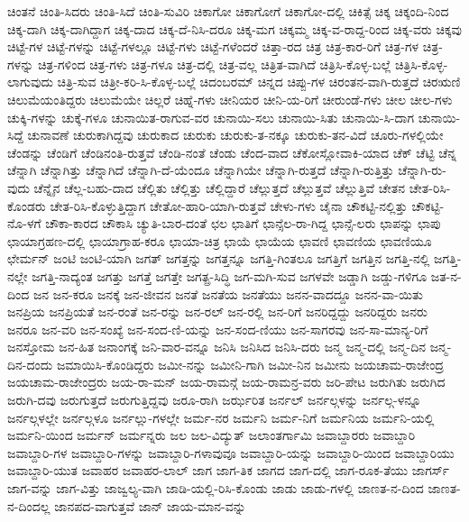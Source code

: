 {ಚಿಂತನೆ
ಚಿಂತಿ-ಸಿದರು
ಚಿಂತಿ-ಸಿದೆ
ಚಿಂತಿ-ಸುವಿರಿ
ಚಿಕಾಗೋ
ಚಿಕಾಗೋಗೆ
ಚಿಕಾಗೋ-ದಲ್ಲಿ
ಚಿಕಿತ್ಸೆ
ಚಿಕ್ಕ
ಚಿಕ್ಕಂದಿ-ನಿಂದ
ಚಿಕ್ಕ-ದಾಗಿ
ಚಿಕ್ಕ-ದಾಗಿದ್ದಾಗ
ಚಿಕ್ಕ-ದಾದ
ಚಿಕ್ಕ-ದೆ-ನಿಸಿ-ದರೂ
ಚಿಕ್ಕ-ಮಗ
ಚಿಕ್ಕಮ್ಮ
ಚಿಕ್ಕ-ವ-ರಾದ್ದ-ರಿಂದ
ಚಿಕ್ಕ-ವರು
ಚಿಕ್ಕವು
ಚಿಟ್ಟೆ-ಗಳ
ಚಿಟ್ಟೆ-ಗಳನ್ನು
ಚಿಟ್ಟೆ-ಗಳಲ್ಲೂ
ಚಿಟ್ಟೆ-ಗಳು
ಚಿಟ್ಟೆ-ಗಳೆಂದರೆ
ಚಿತ್ತಾ-ರದ
ಚಿತ್ರ
ಚಿತ್ರ-ಕಾರ-ರಿಗೆ
ಚಿತ್ರ-ಗಳ
ಚಿತ್ರ-ಗಳನ್ನು
ಚಿತ್ರ-ಗಳಿಂದ
ಚಿತ್ರ-ಗಳು
ಚಿತ್ರ-ಗಳೂ
ಚಿತ್ರ-ದಲ್ಲಿ
ಚಿತ್ರ-ವಲ್ಲ
ಚಿತ್ರಿತ-ವಾಗಿದೆ
ಚಿತ್ರಿಸಿ-ಕೊಳ್ಳ-ಬಲ್ಲೆ
ಚಿತ್ರಿಸಿ-ಕೊಳ್ಳ-ಲಾಗುವುದು
ಚಿತ್ರಿ-ಸುವ
ಚಿತ್ರೀ-ಕರಿ-ಸಿ-ಕೊಳ್ಳ-ಬಲ್ಲೆ
ಚಿದಂಬರಮ್
ಚಿನ್ನದ
ಚಿಪ್ಪು-ಗಳ
ಚಿರಂತನ-ವಾಗಿ-ರುತ್ತದೆ
ಚಿರಋಣಿ
ಚಿಲುಮೆಯಂತಿದ್ದರು
ಚಿಲುಮೆಯೇ
ಚಿಲ್ಲರೆ
ಚಿಹ್ನೆ-ಗಳು
ಚೀನಿಯರ
ಚೀನಿ-ಯ-ರಿಗೆ
ಚೀರುಂಡೆ-ಗಳು
ಚೀಲ
ಚೀಲ-ಗಳು
ಚುಕ್ಕಿ-ಗಳನ್ನು
ಚುಕ್ಕೆ-ಗಳೂ
ಚುನಾಯಿತ-ರಾಗುವ-ವರ
ಚುನಾಯಿ-ಸಲು
ಚುನಾಯಿ-ಸಿತು
ಚುನಾಯಿ-ಸಿ-ದಾಗ
ಚುನಾಯಿ-ಸಿದ್ದೆ
ಚುನಾವಣೆ
ಚುರುಕಾಗಿದ್ದವು
ಚುರುಕಾದ
ಚುರುಕು
ಚುರುಕು-ತ-ನಕ್ಕೂ
ಚುರುಕು-ತನ-ವಿದೆ
ಚೂರು-ಗಳಲ್ಲಿಯೇ
ಚೆಂಡನ್ನು
ಚೆಂಡಿಗೆ
ಚೆಂಡಿನಂತಿ-ರುತ್ತವೆ
ಚೆಂಡಿ-ನಂತೆ
ಚೆಂಡು
ಚೆಂದ-ವಾದ
ಚೆಕೋಸ್ಲೋವಾಕಿ-ಯಾದ
ಚೆಕ್
ಚೆಟ್ಟಿ
ಚೆನ್ನ
ಚೆನ್ನಾಗಿ
ಚೆನ್ನಾಗಿತ್ತು
ಚೆನ್ನಾಗಿದೆ
ಚೆನ್ನಾಗಿ-ದೆ-ಯೆಂದೂ
ಚೆನ್ನಾಗಿಯೇ
ಚೆನ್ನಾಗಿ-ರುತ್ತದೆ
ಚೆನ್ನಾಗಿ-ರುತ್ತಿತ್ತು
ಚೆನ್ನಾಗಿ-ರು-ವುದು
ಚೆನ್ನೈನ
ಚೆಲ್ಲ-ಬಹು-ದಾದ
ಚೆಲ್ಲಿತು
ಚೆಲ್ಲಿತ್ತು
ಚೆಲ್ಲಿದ್ದಾರೆ
ಚೆಲ್ಲುತ್ತದೆ
ಚೆಲ್ಲುತ್ತವೆ
ಚೆಲ್ಲುತ್ತಿವೆ
ಚೇತನ
ಚೇತ-ರಿಸಿ-ಕೊಂಡರು
ಚೇತ-ರಿಸಿ-ಕೊಳ್ಳುತ್ತಿದ್ದಾಗ
ಚೇತೋ-ಹಾರಿ-ಯಾಗಿ-ರುತ್ತವೆ
ಚೇಳು-ಗಳು
ಚೈನಾ
ಚೌಕಟ್ಟಿ-ನಲ್ಲಿತ್ತು
ಚೌಕಟ್ಟಿ-ನೊ-ಳಗೆ
ಚೌಕಾ-ಕಾರದ
ಚೌಕಾಸಿ
ಚ್ಯುತಿ-ಬಾರ-ದಂತೆ
ಛಲ
ಛಾತಿಗೆ
ಛಾನ್ಸೆಲ-ರಾ-ಗಿದ್ದ
ಛಾನ್ಸೆ-ಲರು
ಛಾಪನ್ನು
ಛಾಪು
ಛಾಯಾಗ್ರಹಣ-ದಲ್ಲಿ
ಛಾಯಾಗ್ರಾಹ-ಕರೂ
ಛಾಯಾ-ಚಿತ್ರ
ಛಾಯೆ
ಛಾಯೆಯ
ಛಾವಣಿ
ಛಾವಣಿಯ
ಛಾವಣಿಯೂ
ಛೇರ್ಮನ್
ಜಂಟಿ
ಜಂಟಿ-ಯಾಗಿ
ಜಗತ್
ಜಗತ್ತನ್ನು
ಜಗತ್ತನ್ನೂ
ಜಗತ್ತಿ-ಗಿಂತಲೂ
ಜಗತ್ತಿಗೆ
ಜಗತ್ತಿನ
ಜಗತ್ತಿ-ನಲ್ಲಿ
ಜಗತ್ತಿ-ನಲ್ಲೇ
ಜಗತ್ತಿ-ನಾದ್ಯಂತ
ಜಗತ್ತು
ಜಗತ್ತೆ
ಜಗತ್ತೇ
ಜಗತ್ಪ್ರ-ಸಿದ್ಧಿ
ಜಗ-ಮಗಿ-ಸುವ
ಜಗಳವೇ
ಜಡ್ಡಾಗಿ
ಜಡ್ಡು-ಗಳಿಗೂ
ಜತ-ನ-ದಿಂದ
ಜನ
ಜನ-ಕರೂ
ಜನಕ್ಕೆ
ಜನ-ಜೀವನ
ಜನತೆ
ಜನತೆಯ
ಜನತೆಯು
ಜನನ-ವಾದದ್ದೂ
ಜನನ-ವಾ-ಯಿತು
ಜನಪ್ರಿಯ
ಜನಪ್ರಿಯತೆ
ಜನ-ರಂತೆ
ಜನ-ರನ್ನು
ಜನ-ರಲ್
ಜನ-ರಲ್ಲಿ
ಜನ-ರಿಗೆ
ಜನರಿದ್ದದ್ದು
ಜನರಿದ್ದರು
ಜನರು
ಜನರೂ
ಜನ-ವರಿ
ಜನ-ಸಂಖ್ಯೆ
ಜನ-ಸಂದ-ಣಿ-ಯನ್ನು
ಜನ-ಸಂದ-ಣಿಯು
ಜನ-ಸಾಗರವು
ಜನ-ಸಾ-ಮಾನ್ಯ-ರಿಗೆ
ಜನಸ್ತೋಮ
ಜನ-ಹಿತ
ಜನಾಂಗಕ್ಕೆ
ಜನಿ-ವಾರ-ವನ್ನೂ
ಜನಿಸಿ
ಜನಿಸಿದ
ಜನಿಸಿ-ದರು
ಜನ್ಮ
ಜನ್ಮ-ದಲ್ಲಿ
ಜನ್ಮ-ದಿನ
ಜನ್ಮ-ದಿನ-ದಂದು
ಜಮಾಯಿಸಿ-ಕೊಂಡಿದ್ದರು
ಜಮೀ-ನನ್ನು
ಜಮೀನಿ-ಗಾಗಿ
ಜಮೀ-ನಿನ
ಜಮೀನು
ಜಯಚಾಮ-ರಾಜೇಂದ್ರ
ಜಯಚಾಮ-ರಾಜೇಂದ್ರರು
ಜಯ-ರಾ-ಮನ್
ಜಯ-ರಾಮನ್ಗೆ
ಜಯ-ರಾಮನ್ರ-ವರು
ಜರಿ-ಪೇಟ
ಜರುಗಿತು
ಜರುಗಿದ
ಜರುಗಿ-ದವು
ಜರುಗುತ್ತದೆ
ಜರುಗುತ್ತಿದ್ದವು
ಜರೂ-ರಾಗಿ
ಜರ್ಝರಿತ
ಜರ್ನಲ್
ಜರ್ನಲ್ಗಳನ್ನು
ಜರ್ನಲ್ಗ-ಳನ್ನೂ
ಜರ್ನಲ್ಗಳಲ್ಲೇ
ಜರ್ನಲ್ಗಳೂ
ಜರ್ನಲ್ಲು-ಗಳಲ್ಲೇ
ಜರ್ಮ-ನರ
ಜರ್ಮನಿ
ಜರ್ಮ-ನಿಗೆ
ಜರ್ಮನಿಯ
ಜರ್ಮನಿ-ಯಲ್ಲಿ
ಜರ್ಮನಿ-ಯಿಂದ
ಜರ್ಮನ್
ಜರ್ಮನ್ನರು
ಜಲ
ಜಲ-ವಿದ್ಯುತ್
ಜಲಾಂತರ್ಗಾಮಿ
ಜವಾಬ್ದಾರರು
ಜವಾಬ್ದಾರಿ
ಜವಾಬ್ದಾರಿ-ಗಳ
ಜವಾಬ್ದಾರಿ-ಗಳನ್ನು
ಜವಾಬ್ದಾರಿ-ಗಳಾವುವೂ
ಜವಾಬ್ದಾರಿ-ಯನ್ನು
ಜವಾಬ್ದಾರಿ-ಯಿಂದ
ಜವಾಬ್ದಾರಿಯು
ಜವಾಬ್ದಾರಿ-ಯುತ
ಜವಾಹರ
ಜವಾಹರ-ಲಾಲ್
ಜಾಗ
ಜಾಗ-ತಿಕ
ಜಾಗದ
ಜಾಗ-ದಲ್ಲಿ
ಜಾಗ-ರೂಕ-ತೆಯು
ಜಾಗರ್ಸ್
ಜಾಗ-ವನ್ನು
ಜಾಗ-ವಿತ್ತು
ಜಾಜ್ವಲ್ಯ-ವಾಗಿ
ಜಾಡಿ-ಯಲ್ಲಿ-ರಿಸಿ-ಕೊಂಡು
ಜಾಡು
ಜಾಡು-ಗಳಲ್ಲಿ
ಜಾಣತ-ನ-ದಿಂದ
ಜಾಣತ-ನ-ದಿಂದಲ್ಲ
ಜಾನಪದ-ವಾಗುತ್ತವೆ
ಜಾನ್
ಜಾಯ-ಮಾನ-ವನ್ನು
}
